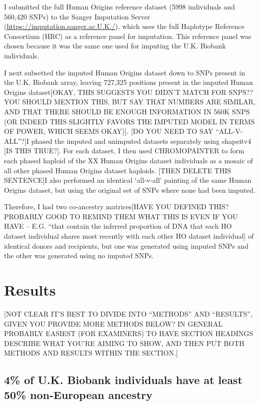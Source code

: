 I submitted the full Human Origins reference dataset (5998 individuals and 560,420 SNPs) to the Sanger Imputation Server (\url{https://imputation.sanger.ac.U.K./}), which uses the full Haplotype Reference Consortium (HRC) as a reference panel for imputation. This reference panel was chosen because it was the same one used for imputing the U.K. Biobank individuals.

I next subsetted the imputed Human Origins dataset down to SNPs present in the U.K. Biobank array, leaving 727,325 positions present in the imputed Human Origins dataset{\color{red}[OKAY, THIS SUGGESTS YOU DIDN'T MATCH FOR SNPS?? YOU SHOULD MENTION THIS, BUT SAY THAT NUMBERS ARE SIMILAR, AND THAT THERE SHOULD BE ENOUGH INFORMATION IN 560K SNPS (OR INDEED THIS SLIGHTLY FAVORS THE IMPUTED MODEL IN TERMS OF POWER, WHICH SEEMS OKAY)]}. {\color{red}[DO YOU NEED TO SAY ``ALL-V-ALL''?]I phased the imputed and unimputed datasets separately using shapeitv4 [IS THIS TRUE?]. For each dataset, I then used CHROMOPAINTER to form each phased haploid of the XX Human Origins dataset individuals as a mosaic of all other phased Human Origins dataset haploids. [THEN DELETE THIS SENTENCE]I also performed an identical `all-v-all' painting of the same Human Origins dataset, but using the original set of SNPs where none had been imputed.}

Therefore, I had {\color{red}two co-ancestry matrices[HAVE YOU DEFINED THIS? PROBABLY GOOD TO REMIND THEM WHAT THIS IS EVEN IF YOU HAVE -- E.G. ``that contain the inferred proportion of DNA that each HO dataset individual shares most recently with each other HO dataset individual]} of identical donors and recipients, but one was generated using imputed SNPs and the other was generated using no imputed SNPs. 


\section{Results}

{\color{red}[NOT CLEAR IT'S BEST TO DIVIDE INTO ``METHODS'' AND ``RESULTS'', GIVEN YOU PROVIDE MORE METHODS BELOW? IN GENERAL PROBABLY EASIEST (FOR EXAMINERS) TO HAVE SECTION HEADINGS DESCRIBE WHAT YOU'RE AIMING TO SHOW, AND THEN PUT BOTH METHODS AND RESULTS WITHIN THE SECTION.]}

\subsection{4\% of U.K. Biobank individuals have at least 50\% non-European ancestry}

